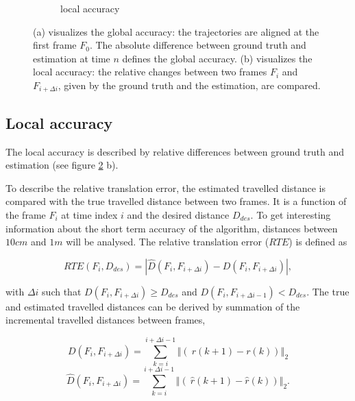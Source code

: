 \begin{figure}
\begin{subfigure}[b]{0.28\textwidth}
    \caption{local accuracy}
    \label{fig:4}
  \end{subfigure}
  \hspace*{1cm}
\caption{(a) visualizes the global accuracy: the trajectories are aligned at the first frame $F_{0}$. The absolute difference between ground truth and estimation at time $n$ defines the global accuracy. (b) visualizes the local accuracy: the relative changes between two frames $F_i$ and $F_{i+\Delta i}$, given by the ground truth and the estimation, are compared.}
\label{pics:absolute_relative}
\end{figure}





\subsection{Local accuracy}
\label{sec:local}

The local accuracy is described by relative differences between ground truth and estimation (see figure \ref{pics:absolute_relative} b). 

To describe the relative translation error, the estimated travelled distance is compared with the true travelled distance between two frames. It is a function of the frame $F_i$ at time index $i$ and the desired distance $D_{des}$. To get interesting information about the short term accuracy of the algorithm, distances between $10cm$ and $1m$ will be analysed. The relative translation error ($RTE$) is defined as

\begin{equation}
RTE \left( F_i, D_{des} \right) = \left| \hat{D} \left( F_i, F_{i+\Delta i} \right) - D \left( F_i, F_{i+\Delta i} \right)\right| ,
\end{equation}

with $ \Delta i $ such that $ D \left( F_i, F_{i+\Delta i} \right) \geq D_{des} $ and $ D \left( F_i, F_{i+\Delta i-1} \right) < D_{des} $. The true and estimated travelled distances can be derived by summation of the incremental travelled distances between frames,

\begin{equation}
       D \left( F_i, F_{i+\Delta i} \right) = \sum_{k=i}^{i+\Delta i-1} \left\Vert\left(\ r \left( k+1 \right) - r \left( k \right) \right) \right\Vert_2
\end{equation}
\begin{equation}
       \hat{D} \left( F_i, F_{i+\Delta i} \right) = \sum_{k=i}^{i+\Delta i-1} \left\Vert\left(\ \hat{r} \left( k+1 \right) - \hat{r} \left( k \right) \right) \right\Vert_2 .
\end{equation}

